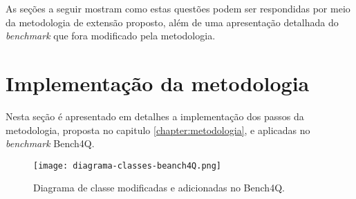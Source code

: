 



As seções a seguir mostram como estas questões podem ser respondidas por meio da metodologia de extensão proposto, além de uma apresentação detalhada do \textit{benchmark} que fora modificado pela metodologia.




\section{Implementação da metodologia}

Nesta seção é apresentado em detalhes a implementação dos passos da metodologia, proposta no capitulo \ref{chapter:metodologia}, e aplicadas no \textit{benchmark} Bench4Q.

\begin{figure}[htb]
	\caption{Diagrama de classe modificadas e adicionadas no Bench4Q.}
	\label{fig:diagrama-classes}
	\centering
	\texttt{[image: diagrama-classes-beanch4Q.png]}	
\end{figure}
	
